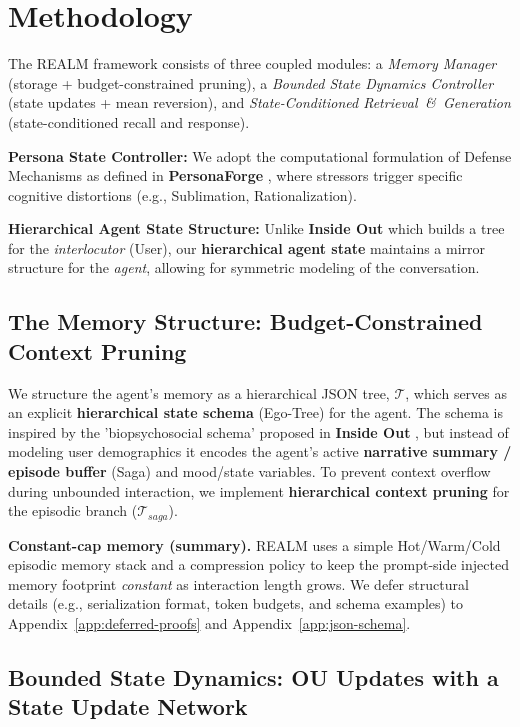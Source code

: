 \documentclass{article}
\begin{document}
\section{Methodology}

The REALM framework consists of three coupled modules: a \textit{Memory Manager} (storage + budget-constrained pruning), a \textit{Bounded State Dynamics Controller} (state updates + mean reversion), and \textit{State-Conditioned Retrieval \,\&\, Generation} (state-conditioned recall and response).

\textbf{Persona State Controller:} We adopt the computational formulation of Defense Mechanisms as defined in \textbf{PersonaForge} \cite{personaforge2026}, where stressors trigger specific cognitive distortions (e.g., Sublimation, Rationalization).

\textbf{Hierarchical Agent State Structure:} Unlike \textbf{Inside Out} \cite{zhao2026inside} which builds a tree for the \textit{interlocutor} (User), our \textbf{hierarchical agent state} maintains a mirror structure for the \textit{agent}, allowing for symmetric modeling of the conversation.

\subsection{The Memory Structure: Budget-Constrained Context Pruning}

We structure the agent's memory as a hierarchical JSON tree, $\mathcal{T}$, which serves as an explicit \textbf{hierarchical state schema} (Ego-Tree) for the agent.
The schema is inspired by the 'biopsychosocial schema' proposed in \textbf{Inside Out} \cite{zhao2026inside}, but instead of modeling user demographics it encodes the agent's active \textbf{narrative summary / episode buffer} (Saga) and mood/state variables.
To prevent context overflow during unbounded interaction, we implement \textbf{hierarchical context pruning} for the episodic branch ($\mathcal{T}_{saga}$).

\textbf{Constant-cap memory (summary).}
REALM uses a simple Hot/Warm/Cold episodic memory stack and a compression policy to keep the prompt-side injected memory footprint \emph{constant} as interaction length grows.
We defer structural details (e.g., serialization format, token budgets, and schema examples) to Appendix~\ref{app:deferred-proofs} and Appendix~\ref{app:json-schema}.


\subsection{Bounded State Dynamics: OU Updates with a State Update Network}
\label{sec:ou}
\end{document}

